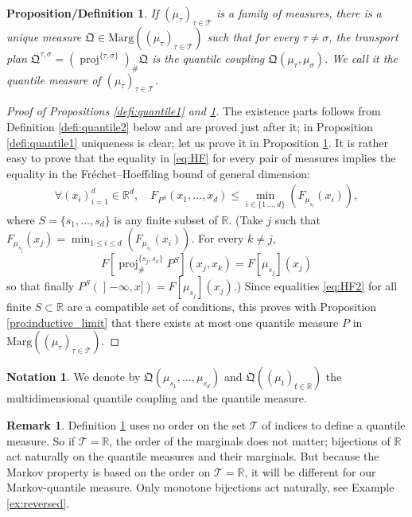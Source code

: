 \documentclass[11pt]{article}
\theoremstyle{plain}
\newtheorem{prodefinition}[them]{Proposition/Definition}
\theoremstyle{definition}
\newtheorem{notation}[them]{Notation} %
\newtheorem{rem}[them]{Remark}
\newcommand{\como}{\mathfrak{Q}}
\newcommand{\Tt}{{\mathcal T}}
\newcommand{\ma}{\mathrm{Marg}}
\newcommand{\R}{\mathbb{R}}
\newcommand{\pr}{\operatorname{proj}}
\newcommand{\op}{\mathopen}
\begin{document}
\begin{prodefinition}\label{defi:quantile_process}If $(\mu_\tau)_{\tau\in\Tt}$ is a family of measures, there is a unique measure $\como\in \ma((\mu_{\tau})_{\tau\in\Tt})$ such that for every $\tau\neq\sigma$, the transport plan $\como^{\tau,\sigma}=(\pr^{\{\tau,\sigma\}})_\#\como$ is the quantile coupling $\como(\mu_\tau,\mu_\sigma)$. We call it the \emph{quantile measure} of $(\mu_\tau)_{\tau\in\Tt}$.
\end{prodefinition}

\begin{proof}[Proof of Propositions \ref{defi:quantile1} and \ref{defi:quantile_process}] The existence parts follows from Definition \ref{defi:quantile2} below and are proved just after it; in Proposition \ref{defi:quantile1} uniqueness is clear; let us prove it in Proposition \ref{defi:quantile_process}. It is rather easy to prove that the equality in \eqref{eq:HF} for every pair of measures implies the equality in the Fréchet--Hoeffding bound of general dimension:
\begin{align}\label{eq:HF2}
\forall(x_i)_{i=1}^d\in\R^d,\quad F_{P^S}(x_1,\ldots,x_d)\leq \min_{i\in\{1\,\ldots,d\}}(F_{\mu_{s_i}}(x_i)),
\end{align}
where $S=\{s_1,\ldots,s_d\}$ is any finite subset of $\R$. (Take $j$ such that $F_{\mu_{s_j}}(x_j)=\min_{1\leq i\leq d}(F_{\mu_{s_i}}(x_i))$. For every $k\neq j$,
\[
F[\pr^{\{s_j,s_k\}}_\#P^S](x_j,x_k)=F[\mu_{s_j}](x_j)
\]
so that finally $P^S(\op]-\infty,x])=F[\mu_{s_j}](x_j)$.) Since equalities \eqref{eq:HF2} for all finite $S\subset\R$ are a compatible set of conditions, this proves with Proposition \ref{pro:inductive_limit} that there exists at most one quantile measure $P$ in $\ma((\mu_\tau)_{\tau\in\Tt})$.
\end{proof}

\begin{notation}\label{not:multi} We denote by $\como(\mu_{s_1},\ldots,\mu_{s_d})$ and $\como((\mu_t)_{t\in \R})$ the multidimensional quantile coupling and the quantile measure.
\end{notation}

\begin{rem}
Definition \ref{defi:quantile_process} uses no order on the set $\Tt$ of indices to define a quantile measure. So if $\Tt=\R$, the order of the marginals does not matter; bijections of $\R$ act naturally on the quantile measures and their marginals. But because the Markov property is based on the order on $\Tt=\R$, it will be different for our Markov-quantile measure. Only monotone bijections act naturally, see Example \ref{ex:reversed}.
\end{rem}
\end{document}
